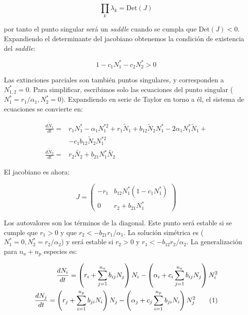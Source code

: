 \begin{equation}
\prod_{k}\lambda_{k}=\mathrm{Det}(J)
\end{equation}

\noindent por tanto el punto singular será un \textit{saddle} cuando se cumpla que  $\mathrm{Det}(J)<0$. Expandiendo el determinante del jacobiano obtenemos la condición de existencia del \textit{saddle}:

\begin{equation}
1-c_{1}N^{*}_{1}-c_{2}N^{*}_{2} >0
\end{equation}

Las extinciones parciales son también puntos singulares, y corresponden a $N^{*}_{1,2} = 0$. Para simplificar, escribimos solo las ecuaciones del punto singular  ($N^{*}_{1}=r_{1}/\alpha_{1},N^{*}_{2}=0$). Expandiendo en serie de Taylor en torno a él, el sistema de ecuaciones se convierte en:

\begin{equation}
\begin{array}{ll}
\displaystyle \frac{d\tilde{N}_{1}}{dt} = & r_{1} N^{*}_{1}-\alpha_{1}N^{*2}_{1}+r_{1}\tilde{N}_{1}+ b_{12}\tilde{N}_{2}N^{*}_1-2\alpha_{1}N^{*}_1\tilde{N}_{1} + \\
\, & - c_{1} b_{12}\tilde{N}_{2}N^{*2}_1\nonumber\\
\displaystyle \frac{d\tilde{N}_{2}}{dt} = & r_{2}\tilde{N_{2}}+ b_{21} N^{*}_1\tilde{N_{2}} 
\end{array}
\label{eq:effrateTaylorN2=0}
\end{equation}

\noindent El jacobiano es ahora:

\begin{equation*}
J = \left(
\begin{array}{rr}
-r_{1} & b_{12}N^{*}_{1}\left(1-c_{1}N^{*}_{1}\right) \\
0 & r_{2}+b_{21}N^{*}_{1}
\end{array}
\right)
\end{equation*}

Los autovalores son los términos de la diagonal. Este punto será estable si se cumple que $r_{1}>0$ y que $r_{2}<-b_{21}r_{1}/\alpha_{1}$. La solución simétrica es ($N^{*}_{1}=0,N^{*}_{2}=r_{2}/\alpha_{2}$) y será estable si  $r_{2}>0$ y $r_{1}<-b_{12}r_{2}/\alpha_{2}$. La generalización para $n_{a} + n_{p}$ especies es:
 
\begin{align}
\frac{dN_{i}}{dt} = \left( r_{i}+ \sum_{j=1}^{n_{a}} b_{ij}N_{j}\right)N_{i} - \left(\alpha_{i}+ c_{i} \sum_{j=1}^{n_{a}} b_{ij}N_{j} \right) N^{2}_{i} \nonumber\\ 
\frac{dN_{j}}{dt} = \left( r_{j}+ \sum_{i=1}^{n_{p}} b_{ji}N_{i}\right)N_{j} - \left(\alpha_{j}+ c_{j} \sum_{i=1}^{n_{p}} b_{ji} N_{i} \right) N^{2}_{j} 
\stepcounter{equation}\tag{\theequation}\label{eq:N_especies}
\end{align}

